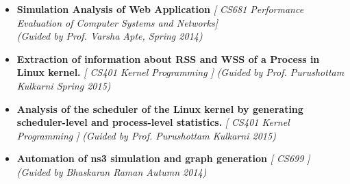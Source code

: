 \begin{itemize}
\item \textbf{Simulation Analysis of Web Application } \emph{[ CS681 Performance Evaluation of Computer Systems and Networks]} \\
	\emph{(Guided by Prof. Varsha Apte, Spring 2014)} \hfill \\[-0.6cm]	
	\item \textbf{Extraction of information about RSS and WSS of a Process in Linux kernel.} \hfill \emph{[ CS401 Kernel Programming ]}
	\emph{(Guided by Prof. Purushottam Kulkarni Spring 2015)} \\[-0.6cm]
	\item \textbf{Analysis of the scheduler of the Linux kernel by generating scheduler-level and process-level statistics.} \hfill \emph{[ CS401 Kernel Programming ]}
	\emph{(Guided by Prof. Purushottam Kulkarni 2015)}\hfill \\[-0.7cm]
	
	\item \textbf{Automation of ns3 simulation and graph generation} \hfill \emph{[ CS699 ]} 
	\emph{(Guided by Bhaskaran Raman Autumn 2014)}\hfill \\[-0.6cm]
	
\end{itemize}
